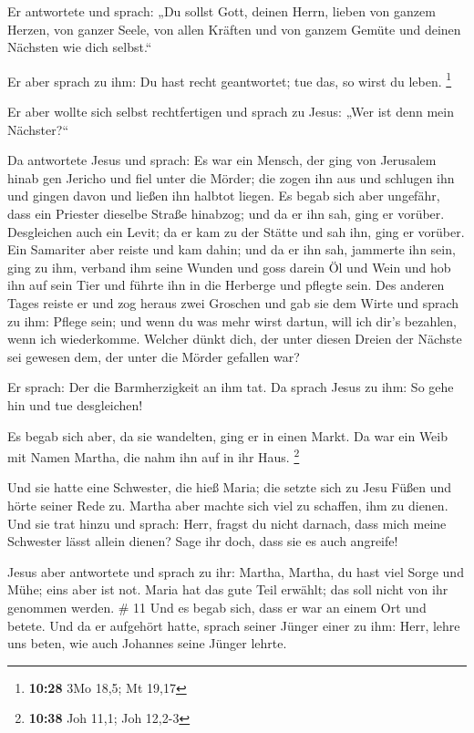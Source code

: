  Er antwortete und sprach: „Du sollst Gott, deinen Herrn,
lieben von ganzem Herzen, von ganzer Seele, von allen Kräften und von
ganzem Gemüte und deinen Nächsten wie dich selbst.``

 Er aber sprach zu ihm: Du hast recht geantwortet; tue das,
so wirst du leben. \footnote{\textbf{10:28} 3Mo 18,5; Mt 19,17}

 Er aber wollte sich selbst rechtfertigen und sprach zu
Jesus: „Wer ist denn mein Nächster?{}``

 Da antwortete Jesus und sprach: Es war ein Mensch, der
ging von Jerusalem hinab gen Jericho und fiel unter die Mörder; die
zogen ihn aus und schlugen ihn und gingen davon und ließen ihn halbtot
liegen.  Es begab sich aber ungefähr, dass ein Priester
dieselbe Straße hinabzog; und da er ihn sah, ging er vorüber.
 Desgleichen auch ein Levit; da er kam zu der Stätte und
sah ihn, ging er vorüber.  Ein Samariter aber reiste und
kam dahin; und da er ihn sah, jammerte ihn sein,  ging zu
ihm, verband ihm seine Wunden und goss darein Öl und Wein und hob ihn
auf sein Tier und führte ihn in die Herberge und pflegte sein.
 Des anderen Tages reiste er und zog heraus zwei Groschen
und gab sie dem Wirte und sprach zu ihm: Pflege sein; und wenn du was
mehr wirst dartun, will ich dir's bezahlen, wenn ich wiederkomme.
 Welcher dünkt dich, der unter diesen Dreien der Nächste
sei gewesen dem, der unter die Mörder gefallen war?

 Er sprach: Der die Barmherzigkeit an ihm tat. Da sprach
Jesus zu ihm: So gehe hin und tue desgleichen!

 Es begab sich aber, da sie wandelten, ging er in einen
Markt. Da war ein Weib mit Namen Martha, die nahm ihn auf in ihr Haus.
\footnote{\textbf{10:38} Joh 11,1; Joh 12,2-3}

 Und sie hatte eine Schwester, die hieß Maria; die setzte
sich zu Jesu Füßen und hörte seiner Rede zu.  Martha aber
machte sich viel zu schaffen, ihm zu dienen. Und sie trat hinzu und
sprach: Herr, fragst du nicht darnach, dass mich meine Schwester lässt
allein dienen? Sage ihr doch, dass sie es auch angreife!

 Jesus aber antwortete und sprach zu ihr: Martha, Martha,
du hast viel Sorge und Mühe;  eins aber ist not. Maria hat
das gute Teil erwählt; das soll nicht von ihr genommen werden. \# 11
 Und es begab sich, dass er war an einem Ort und betete. Und
da er aufgehört hatte, sprach seiner Jünger einer zu ihm: Herr, lehre
uns beten, wie auch Johannes seine Jünger lehrte.

